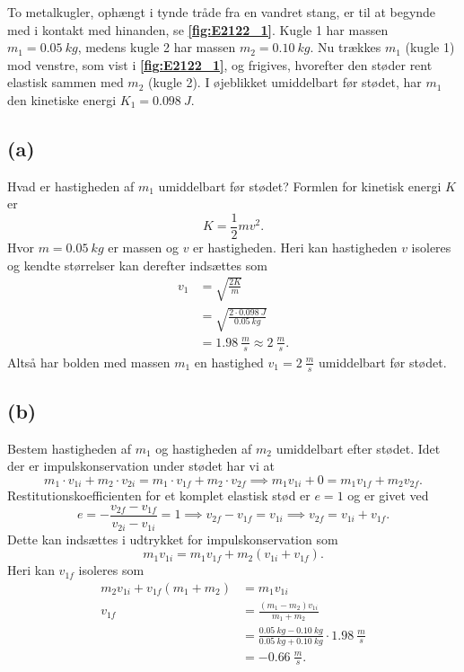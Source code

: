 \documentclass[12pt]{article}
\theoremstyle{definition}
\begin{document}
To metalkugler, ophængt i tynde tråde fra en vandret stang, er til at begynde med i kontakt med hinanden, se \textbf{\autoref{fig:E2122_1}}. Kugle 1 har massen $m_1 = \qty{0,05}{kg}$, medens kugle 2 har massen $m_2 = \qty{0,10}{kg}$. Nu trækkes  $m_1$ (kugle 1) mod venstre, som vist i \textbf{\autoref{fig:E2122_1}}, og frigives, hvorefter den støder rent elastisk  sammen  med  $m_2$  (kugle  2).  I  øjeblikket  umiddelbart  før  stødet,  har  $m_1$  den  kinetiske  energi $K_1 = \qty{0,098}{J}$.

\subsection*{(a)}
Hvad er hastigheden af $m_1$ umiddelbart før stødet?
\bigbreak
Formlen for kinetisk energi $K$ er
\[ 
K = \frac{1}{2}mv^2
.\]
Hvor $m = \qty{0,05}{kg}$ er massen og $v$ er hastigheden. Heri kan hastigheden $v$ isoleres og kendte størrelser kan derefter indsættes som
\begin{align*}
  v_1 &= \sqrt{\frac{2K}{m}} \\
  &= \sqrt{\frac{2\cdot \qty{0,098}{J}}{\qty{0,05}{kg}}} \\
  &= \qty{1,98}{\frac{m}{s}} \approx \qty{2}{\frac{m}{s}} 
.\end{align*}
Altså har bolden med massen $m_1$ en hastighed $v_{1} = \qty{2}{\frac{m}{s}}$ umiddelbart før stødet.


\subsection*{(b)}
Bestem hastigheden af $m_1$ og hastigheden af $m_2$ umiddelbart efter stødet.
\bigbreak
Idet der er impulskonservation under stødet har vi at
\[ 
m_{1}\cdot v_{1i} + m_2 \cdot v_{2i} = m_1 \cdot v_{1f} + m_2 \cdot v_{2f} \implies m_1 v_{1i} + 0 = m_1 v_{1f} + m_2 v_{2f}
.\]
Restitutionskoefficienten for et komplet elastisk stød er $e = 1$ og er givet ved
\[ 
e = - \frac{v_{2f} - v_{1f}}{v_{2i} - v_{1i}} = 1 \implies v_{2f} - v_{1f} = v_{1i} \implies v_{2f} = v_{1i} + v_{1f}
.\]
Dette kan indsættes i udtrykket for impulskonservation som
\[ 
m_1 v_{1i} = m_1 v_{1f} + m_{2} (v_{1i} + v_{1f})
.\]
Heri kan $v_{1f}$ isoleres som
\begin{align*}
  m_2 v_{1i} + v_{1f} (m_1 + m_2) &= m_1 v_{1i} \\
  v_{1f} &= \frac{(m_1 - m_2) v_{1i}}{m_1 + m_2} \\
  &= \frac{\qty{0,05}{kg} - \qty{0,10}{kg}}{\qty{0,05}{kg} + \qty{0,10}{kg}}\cdot \qty{1,98}{\frac{m}{s}}  \\
  &= - \qty{0,66}{\frac{m}{s}} 
.\end{align*}
\end{document}
